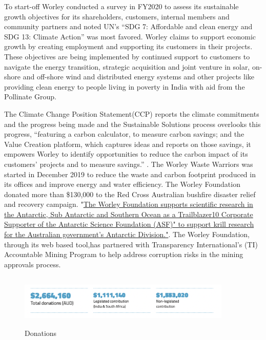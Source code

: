\documentclass[11pt,a4paper,]{article}
\begin{document}
To start-off Worley conducted a survey in FY2020 to assess its sustainable growth objectives for its shareholders, customers, internal members and community partners and noted UN's ``SDG 7: Affordable and clean energy and SDG 13: Climate Action'' \textcite{sdg} was most favored. Worley claims to support economic growth by creating employment and supporting its customers in their projects. These objectives are being implemented by continued support to customers to navigate the energy transition, strategic acquisition and joint venture in solar, on-shore and off-shore wind and distributed energy systems and other projects like providing clean energy to people living in poverty in India with aid from the Pollinate Group.

The Climate Change Position Statement(CCP) reports the climate commitments and the progress being made and the Sustainable Solutions process overlooks this progress, ``featuring a carbon calculator, to measure carbon savings; and the Value Creation platform, which captures ideas and reports on those savings, it empowers Worley to identify opportunities to reduce the carbon impact of its customers' projects and to measure savings.'' \textcite{sustainabilityreport2020}. The Worley Waste Warriors was started in December 2019 to reduce the waste and carbon footprint produced in its offices and improve energy and water efficiency. The Worley Foundation donated more than \$130,000 to the Red Cross Australian bushfire disaster relief and recovery campaign. "\href{https://www.worley.com/our-work/australian-antarctic-climate-change-research}{The Worley Foundation supports scientific research in the Antarctic, Sub Antarctic and Southern Ocean as a Trailblazer10 Corporate Supporter of the Antarctic Science Foundation (ASF)" to support krill research for the Australian government's Antarctic Division."}. The Worley Foundation, through its web based tool,has partnered with Transparency International's (TI) Accountable Mining Program to help address corruption risks in the mining approvals process.

\begin{figure}[H]
\includegraphics[width=4in, height = 1in]{Figures/donations}
\caption{Donations}
\label{fig:donations}
\end{figure}
\end{document}
